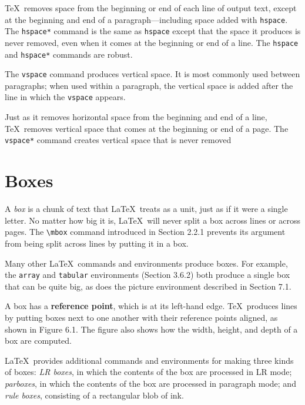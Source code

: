 \documentclass{article}
\begin{document}
\TeX\ removes space from the beginning or end of each line of output text, except at the beginning
and end of a paragraph---including space added with \verb:hspace:. 
The \verb:hspace*: command is the same as \verb:hspace: except that the space it produces is
never removed, even when it comes at the beginning or end of a line. 
The \verb:hspace: and \verb:hspace*: commands are robust.

The \verb:vspace: command produces vertical space. It is most commonly used between paragraphs;
when used within a paragraph, the vertical space is added after the line in which the 
\verb:vspace: appears.

Just as it removes horizontal space from the beginning and end of a line, \TeX\ removes vertical
space that comes at the beginning or end of a page. The \verb:vspace*: command creates vertical
space that is never removed


\section{Boxes}\label{sec-boxes}

A \emph{box} is a chunk of text that \LaTeX\ treats as a unit, just as if it were a single letter.
No matter how big it is, \LaTeX\ will never split a box across lines or across pages.
The \verb:\mbox: command introduced in Section 2.2.1 prevents its argument from being split across
lines by putting it in a box.

Many other \LaTeX\ commands and environments produce boxes. For example, the \texttt{array} and 
\texttt{tabular} environments (Section 3.6.2) both produce a single box that can be quite big, as
does the picture environment described in Section 7.1.

A box has a \textbf{reference point}, which is at its left-hand edge. \TeX\ produces lines by
putting boxes next to one another with their reference points aligned, as shown in Figure 6.1. The
figure also shows how the width, height, and depth of a box are computed.

\LaTeX\ provides additional commands and environments for making three kinds of boxes: 
\emph{LR boxes}, in which the contents of the box are processed in LR mode; 
\emph{parboxes}, in which the contents of the box are processed in paragraph mode; and 
\emph{rule boxes}, consisting of a rectangular blob of ink.
\end{document}
